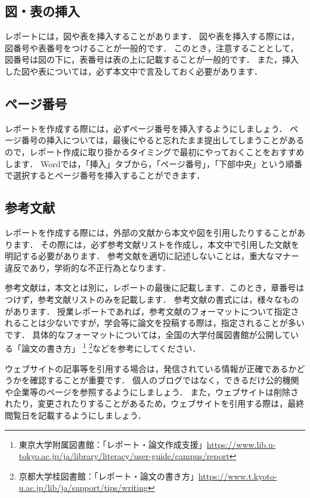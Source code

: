 \documentclass{jarticle}
\begin{document}
\subsection{図・表の挿入}
レポートには，図や表を挿入することがあります．
図や表を挿入する際には，図番号や表番号をつけることが一般的です．
このとき，注意することとして，図番号は図の下に，表番号は表の上に記載することが一般的です．
また，挿入した図や表については，必ず本文中で言及しておく必要があります．

\subsection{ページ番号}
レポートを作成する際には，必ずページ番号を挿入するようにしましょう．
ページ番号の挿入については，最後にやると忘れたまま提出してしまうことがあるので，レポート作成に取り掛かるタイミングで最初にやっておくことをおすすめします．
Wordでは，「挿入」タブから，「ページ番号」，「下部中央」という順番で選択するとページ番号を挿入することができます．

\subsection{参考文献}
レポートを作成する際には，外部の文献から本文や図を引用したりすることがあります．
その際には，必ず参考文献リストを作成し，本文中で引用した文献を明記する必要があります．
参考文献を適切に記述しないことは，重大なマナー違反であり，学術的な不正行為となります．

参考文献は，本文とは別に，レポートの最後に記載します．このとき，章番号はつけず，参考文献リストのみを記載します．
参考文献の書式には，様々なものがあります．
授業レポートであれば，参考文献のフォーマットについて指定されることは少ないですが，学会等に論文を投稿する際は，指定されることが多いです．
具体的なフォーマットについては，全国の大学付属図書館が公開している「論文の書き方」
\footnote{東京大学附属図書館：「レポート・論文作成支援」\url{https://www.lib.u-tokyo.ac.jp/ja/library/literacy/user-guide/campus/report}}
\footnote{京都大学桂図書館：「レポート・論文の書き方」\url{https://www.t.kyoto-u.ac.jp/lib/ja/support/tips/writing}}などを参考にしてください．

ウェブサイトの記事等を引用する場合は，発信されている情報が正確であるかどうかを確認することが重要です．
個人のブログではなく，できるだけ公的機関や企業等のページを参照するようにしましょう．
また，ウェブサイトは削除されたり，変更されたりすることがあるため，ウェブサイトを引用する際は，最終閲覧日を記載するようにしましょう．
\end{document}
